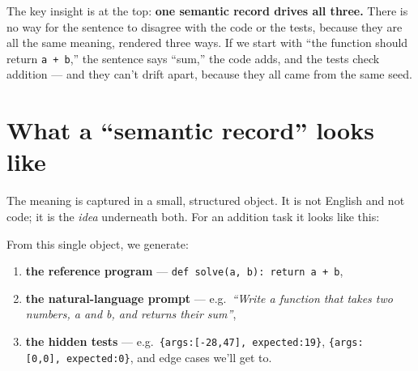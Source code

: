 The key insight is at the top: \textbf{one semantic record drives all
three.} There is no way for the sentence to disagree with the code or
the tests, because they are all the same meaning, rendered three ways.
If we start with ``the function should return \texttt{a\ +\ b},'' the
sentence says ``sum,'' the code adds, and the tests check addition ---
and they can't drift apart, because they all came from the same seed.

\section{What a ``semantic record'' looks
like}\label{what-a-semantic-record-looks-like}

The meaning is captured in a small, structured object. It is not English
and not code; it is the \emph{idea} underneath both. For an addition
task it looks like this:

\begin{Shaded}
\begin{Highlighting}[]
\FunctionTok{\{}
  \FunctionTok{:} \FunctionTok{,}
  \FunctionTok{:} \OtherTok{[}\FunctionTok{\{}\FunctionTok{:} \FunctionTok{,} \FunctionTok{:} \FunctionTok{,} \FunctionTok{:} \FunctionTok{\}}\OtherTok{,}
           \FunctionTok{\{}\FunctionTok{:} \FunctionTok{,} \FunctionTok{:} \FunctionTok{,} \FunctionTok{:} \FunctionTok{\}}\OtherTok{]}\FunctionTok{,}
  \FunctionTok{:} 
\FunctionTok{\}}
\end{Highlighting}
\end{Shaded}

From this single object, we generate:

\begin{enumerate}
\def\labelenumi{\arabic{enumi}.}
\tightlist
\item
  \textbf{the reference program} ---
  \texttt{def\ solve(a,\ b):\ return\ a\ +\ b},
\item
  \textbf{the natural-language prompt} --- e.g.~\emph{``Write a function
  that takes two numbers, a and b, and returns their sum''},
\item
  \textbf{the hidden tests} ---
  e.g.~\texttt{\{args:{[}-28,47{]},\ expected:19\}},
  \texttt{\{args:{[}0,0{]},\ expected:0\}}, and edge cases we'll get to.
\end{enumerate}

